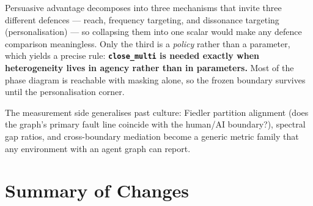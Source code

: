 \documentclass[11pt]{article}
\begin{document}
\noindent Persuasive advantage decomposes into three mechanisms that invite three different
defences --- reach, frequency targeting, and dissonance targeting (personalisation) --- so
collapsing them into one scalar would make any defence comparison meaningless. Only the
third is a \emph{policy} rather than a parameter, which yields a precise rule:
\textbf{\texttt{close\_multi} is needed exactly when heterogeneity lives in agency rather
than in parameters.} Most of the phase diagram is reachable with masking alone, so the
frozen boundary survives until the personalisation corner.

The measurement side generalises past culture: Fiedler partition alignment (does the graph's
primary fault line coincide with the human/AI boundary?), spectral gap ratios, and
cross-boundary mediation become a generic metric family that any environment with an agent
graph can report.

\section{Summary of Changes}
\end{document}

